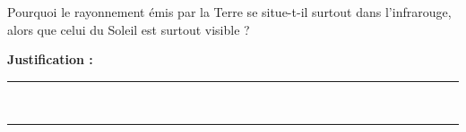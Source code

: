 Pourquoi le rayonnement émis par la Terre se situe-t-il surtout dans l'infrarouge, alors que celui du Soleil est surtout visible ?

\choices

\noindent\textbf{Justification :} \hrulefill \\[2.5ex]
\rule{\linewidth}{0.4pt} \\[2.5ex]
\rule{\linewidth}{0.4pt}
\vfill
